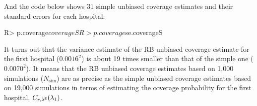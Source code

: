 \documentclass[article]{jss}
\begin{document}
And the code below shows 31 simple unbiased coverage estimates and their standard errors for each hospital.
\begin{CodeChunk}
\begin{CodeInput}
R> p.coverage$coverageS
R> p.coverage$se.coverageS
\end{CodeInput}
\end{CodeChunk}



It turns out that the variance estimate of the RB unbiased coverage estimate for the first hospital ($0.0016^2$) is about 19 times smaller than that of the simple one ($0.0070^2$). It means that the RB unbiased coverage estimates based on 1,000 simulations ($N_{\textrm{sim}}$) are as precise as the simple unbiased coverage estimates based on 19,000 simulations in terms of estimating the coverage probability for the first hospital, $C_{r, \lambda^{\mathsf{E}}}(\lambda_1)$.
\end{document}
